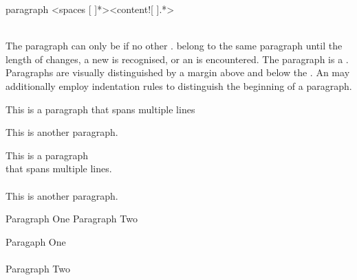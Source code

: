 \begin{identifier}{paragraph}
<spaces [ ]*><content![ ].*>
\end{identifier}
 \\

The paragraph can only be  if no other  .  belong to the same paragraph until the length of  changes, a new  is recognised, or an  is encountered. The paragraph is a . \\

Paragraphs are visually distinguished by a margin above and below the . An  may additionally employ indentation rules to distinguish the beginning of a paragraph. \\

\begin{examples}
  \begin{examplesource}
This is a paragraph
that spans multiple lines

This is another paragraph.
  \end{examplesource}
  \begin{exampleoutput}
    This is a paragraph\\
    that spans multiple lines.\\
    \\
    This is another paragraph.
  \end{exampleoutput}
  \begin{examplesource}
Paragraph One
  Paragraph Two
  \end{examplesource}
  \begin{exampleoutput}
    Paragaph One\\
    \\
    Paragraph Two
  \end{exampleoutput}
\end{examples}

